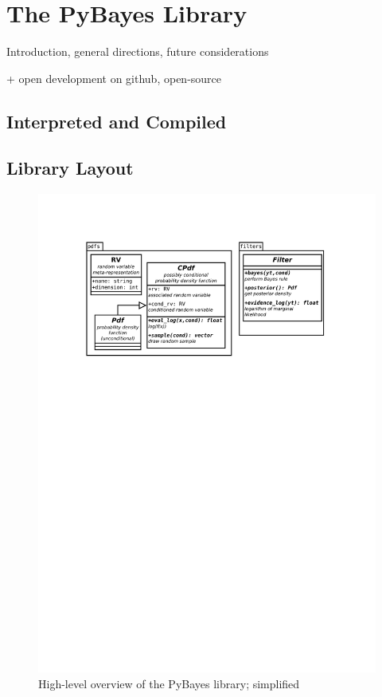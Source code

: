 \chapter{The PyBayes Library}

Introduction, general directions, future considerations

+ open development on github, open-source

\section{Interpreted and Compiled}

\section{Library Layout}

\begin{figure}[h]
	\centering
	\includegraphics[width=\textwidth,keepaspectratio=true,clip=true,trim=3cm 196mm 3cm 3cm]{./diagrams/PyBayes.pdf}
	\vspace{-8mm}
	\caption{High-level overview of the PyBayes library; simplified}
\end{figure}


